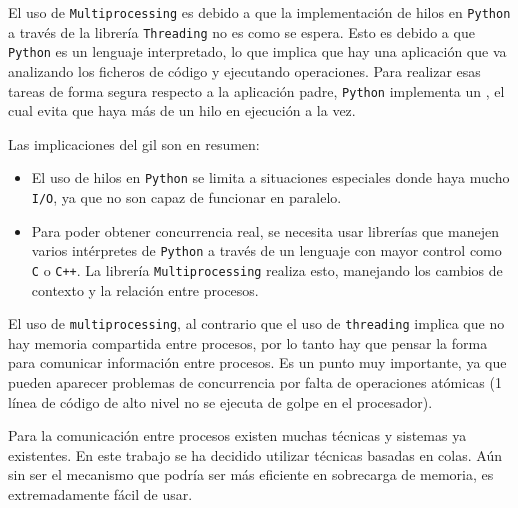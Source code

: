 El uso de \texttt{Multiprocessing} es debido a que la implementación de hilos en \texttt{Python} a través de la librería \texttt{Threading} no es como se espera. Esto es debido a que \texttt{Python} es 
un lenguaje interpretado, lo que implica que hay una aplicación que va analizando los ficheros de código y ejecutando operaciones.\newline
Para realizar esas tareas de forma segura respecto a la aplicación padre, \texttt{Python} implementa un \texttt{}, el cual evita que haya más de un hilo en ejecución a la vez.

Las implicaciones del \acrshort{gil} son en resumen:
\begin{itemize}
    \item El uso de hilos en \texttt{Python} se limita a situaciones especiales donde haya mucho \texttt{I/O}, ya que no son capaz de funcionar en paralelo.
    \item Para poder obtener concurrencia real, se necesita usar librerías que manejen varios intérpretes de \texttt{Python} a través de un lenguaje con mayor control como \texttt{C} o \texttt{C++}. 
    La librería \texttt{Multiprocessing} realiza esto, manejando los cambios de contexto y la relación entre procesos.
\end{itemize}

El uso de \texttt{multiprocessing}, al contrario que el uso de \texttt{threading} implica que no hay memoria compartida entre procesos, por lo tanto hay que pensar la forma para comunicar información 
entre procesos. Es un punto muy importante, ya que pueden aparecer problemas de concurrencia por falta de operaciones atómicas (1 línea de código de alto nivel no se ejecuta de golpe en el procesador).

Para la comunicación entre procesos existen muchas técnicas y sistemas ya existentes. En este trabajo se ha decidido utilizar técnicas basadas en colas. Aún sin ser el mecanismo que podría ser más 
eficiente en sobrecarga de memoria, es extremadamente fácil de usar.

